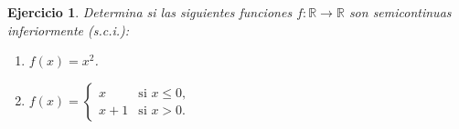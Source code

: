 \documentclass[11pt]{report}
\newtheorem{ex}{Ejercicio}
\begin{document}
\begin{ex}
  Determina si las siguientes funciones \( f: \mathbb{R} \to \mathbb{R} \) son semicontinuas inferiormente (s.c.i.):
  \begin{enumerate}
    \item \( f(x) = x^2 \).
    \item \( f(x) = \begin{cases}
      x & \text{si } x \leq 0, \\
      x + 1 & \text{si } x > 0.
    \end{cases} \)
  \end{enumerate}


\end{ex}
\end{document}
